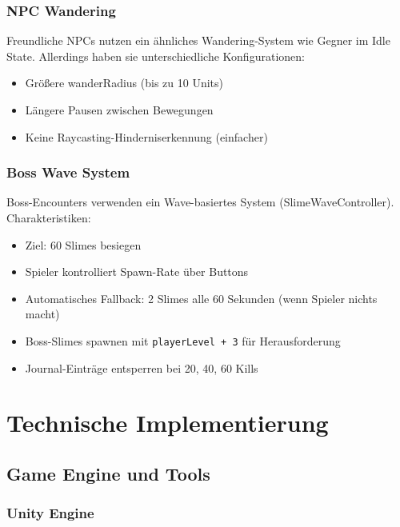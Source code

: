 \documentclass[
  a4paper,
  11pt,
  ngerman,
  parskip=half,
  bibliography=totoc,
  listof=totoc
]{scrreprt}
\begin{document}
\subsection{NPC Wandering}

Freundliche NPCs nutzen ein ähnliches Wandering-System wie Gegner im Idle State. Allerdings haben sie unterschiedliche Konfigurationen:
\begin{itemize}
    \item Größere wanderRadius (bis zu 10 Units)
    \item Längere Pausen zwischen Bewegungen
    \item Keine Raycasting-Hinderniserkennung (einfacher)
\end{itemize}

\subsection{Boss Wave System}

Boss-Encounters verwenden ein Wave-basiertes System (SlimeWaveController). Charakteristiken:
\begin{itemize}
    \item Ziel: 60 Slimes besiegen
    \item Spieler kontrolliert Spawn-Rate über Buttons
    \item Automatisches Fallback: 2 Slimes alle 60 Sekunden (wenn Spieler nichts macht)
    \item Boss-Slimes spawnen mit \texttt{playerLevel + 3} für Herausforderung
    \item Journal-Einträge entsperren bei 20, 40, 60 Kills
\end{itemize}


\chapter{Technische Implementierung}

\section{Game Engine und Tools}

\subsection{Unity Engine}
\end{document}
